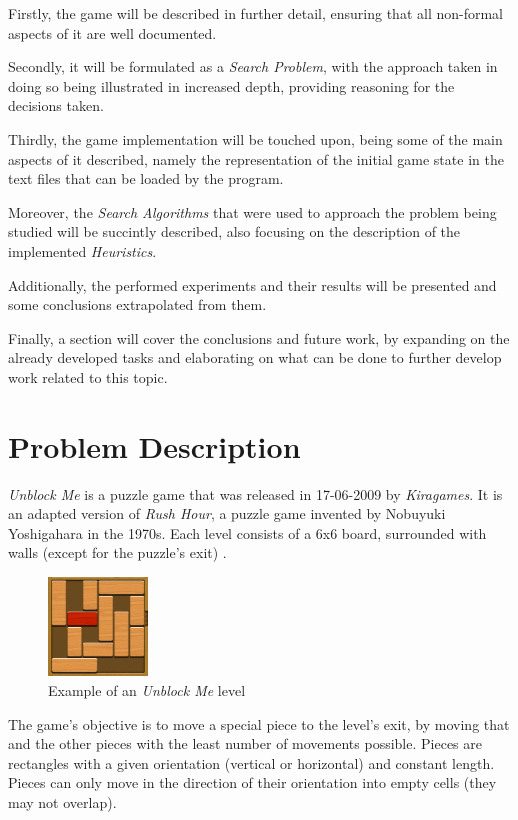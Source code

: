 \documentclass[conference]{IEEEtran}
\begin{document}
Firstly, the game will be described in further detail, ensuring that all non-formal aspects of it are well documented.

Secondly, it will be formulated as a \textit{Search Problem}, with the approach taken in doing so being illustrated in increased depth, providing reasoning for the decisions taken.

Thirdly, the game implementation will be touched upon, being some of the main aspects of it described, namely the representation of the initial game state in the text files that can be loaded by the program.

Moreover, the \textit{Search Algorithms} that were used to approach the problem being studied will be succintly described, also focusing on the description of the implemented \textit{Heuristics}.

Additionally, the performed experiments and their results will be presented and some conclusions extrapolated from them.

Finally, a section will cover the conclusions and future work, by expanding on the already developed tasks and elaborating on what can be done to further develop work related to this topic.

\section{Problem Description}
\textit{Unblock Me} is a puzzle game that was released in 17-06-2009 by \textit{Kiragames}. It is an adapted version of \textit{Rush Hour}, a puzzle game invented by Nobuyuki Yoshigahara in the 1970s. Each level consists of a 6x6 board, surrounded with walls (except for the puzzle's exit) \cite{b1}.

\begin{figure}[H]
    \centerline{\includegraphics[width=100px]{img1.png}}
    \caption{Example of an \textit{Unblock Me} level}
\end{figure}

The game's objective is to move a special piece to the level's exit, by moving that and the other pieces with the least number of movements possible. Pieces are rectangles with a given orientation (vertical or horizontal) and constant length. Pieces can only move in the direction of their orientation into empty cells (they may not overlap).  
\end{document}
